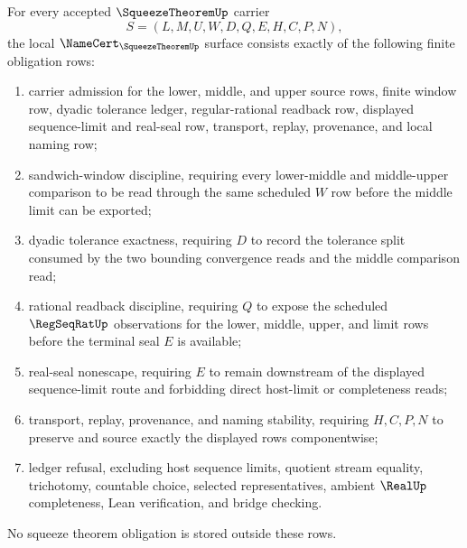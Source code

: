 \begin{theorem}
\label{thm:squeeze-theorem-namecert-obligations}
For every accepted $\SqueezeTheoremUp$ carrier
$$
S=(L,M,U,W,D,Q,E,H,C,P,N),
$$
the local $\NameCert_{\SqueezeTheoremUp}$ surface consists exactly of the following finite obligation rows:
\begin{enumerate}
\item carrier admission for the lower, middle, and upper source rows, finite window row, dyadic tolerance ledger, regular-rational readback row, displayed sequence-limit and real-seal row, transport, replay, provenance, and local naming row;
\item sandwich-window discipline, requiring every lower-middle and middle-upper comparison to be read through the same scheduled $W$ row before the middle limit can be exported;
\item dyadic tolerance exactness, requiring $D$ to record the tolerance split consumed by the two bounding convergence reads and the middle comparison read;
\item rational readback discipline, requiring $Q$ to expose the scheduled $\RegSeqRatUp$ observations for the lower, middle, upper, and limit rows before the terminal seal $E$ is available;
\item real-seal nonescape, requiring $E$ to remain downstream of the displayed sequence-limit route and forbidding direct host-limit or completeness reads;
\item transport, replay, provenance, and naming stability, requiring $H,C,P,N$ to preserve and source exactly the displayed rows componentwise;
\item ledger refusal, excluding host sequence limits, quotient stream equality, trichotomy, countable choice, selected representatives, ambient $\RealUp$ completeness, Lean verification, and bridge checking.
\end{enumerate}
No squeeze theorem obligation is stored outside these rows.
\end{theorem}

